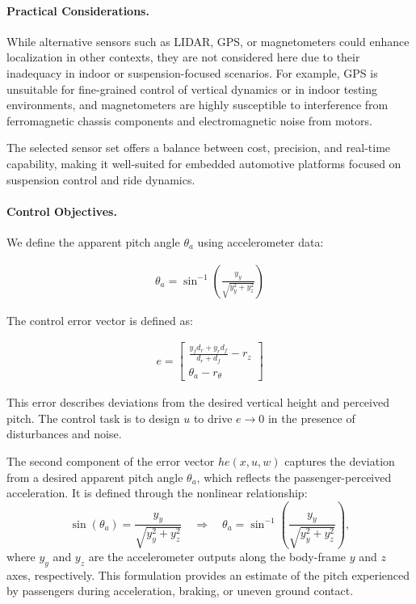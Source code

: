 \documentclass[]{report}
\begin{document}
\paragraph{Practical Considerations.}
While alternative sensors such as LIDAR, GPS, or magnetometers could enhance localization in other contexts, they are not considered here due to their inadequacy in indoor or suspension-focused scenarios. For example, GPS is unsuitable for fine-grained control of vertical dynamics or in indoor testing environments, and magnetometers are highly susceptible to interference from ferromagnetic chassis components and electromagnetic noise from motors.

The selected sensor set offers a balance between cost, precision, and real-time capability, making it well-suited for embedded automotive platforms focused on suspension control and ride dynamics.


\paragraph{Control Objectives.}

We define the apparent pitch angle $\theta_a$ using accelerometer data:

\begin{align}
	\theta_a = \sin^{-1} \left( \frac{y_y}{\sqrt{y_y^2 + y_z^2}} \right)
\end{align}

The control error vector is defined as:

\begin{align}
	e = \begin{bmatrix}
		\frac{y_f d_r + y_r d_f}{d_r + d_f} - r_z \\
		\theta_a - r_\theta
	\end{bmatrix}
\end{align}

This error describes deviations from the desired vertical height and perceived pitch. The control task is to design $u$ to drive $e \rightarrow 0$ in the presence of disturbances and noise.

The second component of the error vector $he(x,u,w)$ captures the deviation from a desired apparent pitch angle $\theta_a$, which reflects the passenger-perceived acceleration. It is defined through the nonlinear relationship:
\[
\sin(\theta_a) = \frac{y_y}{\sqrt{y_y^2 + y_z^2}} \quad \Rightarrow \quad \theta_a = \sin^{-1}\left(\frac{y_y}{\sqrt{y_y^2 + y_z^2}}\right),
\]
where $y_y$ and $y_z$ are the accelerometer outputs along the body-frame $y$ and $z$ axes, respectively. This formulation provides an estimate of the pitch experienced by passengers during acceleration, braking, or uneven ground contact.
\end{document}
